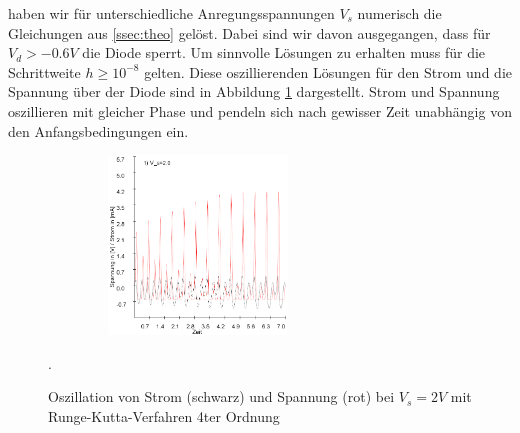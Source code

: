 \documentclass[12pt,a4paper]{article}
\begin{document}
haben wir für unterschiedliche Anregungsspannungen $V_s$ numerisch die Gleichungen aus  \ref{ssec:theo} gelöst. Dabei sind wir davon ausgegangen, dass für $V_d > -0.6V$ die Diode sperrt.
\newline
Um sinnvolle Lösungen zu erhalten muss für die Schrittweite $h \geq 10^{-8}$ gelten. Diese oszillierenden Lösungen für den Strom und die Spannung über der Diode sind in Abbildung \ref{fig:ldr-oszi} dargestellt. Strom und Spannung oszillieren mit gleicher Phase und pendeln sich nach gewisser Zeit unabhängig von den Anfangsbedingungen ein.
\begin{figure}[!htbp]
\centering
\includegraphics[height=180px,width=300px]{runge-oszillation-100k-2V}
\caption{Oszillation von Strom (schwarz) und Spannung (rot) bei $V_s=2V$ mit Runge-Kutta-Verfahren 4ter Ordnung}. 
\label{fig:ldr-oszi}
\end{figure}
\end{document}
